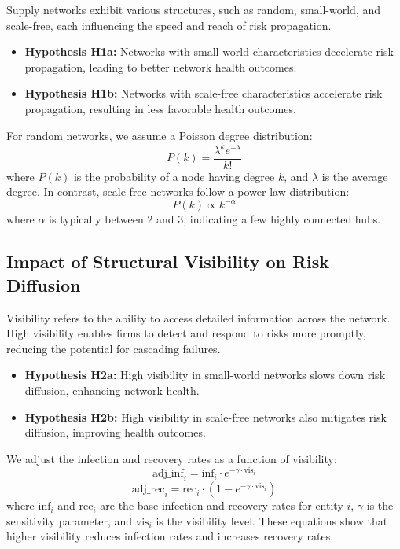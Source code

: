\documentclass{article}
\begin{document}
Supply networks exhibit various structures, such as random, small-world, and scale-free, each influencing the speed and reach of risk propagation.

\begin{itemize}
    \item \textbf{Hypothesis H1a:} Networks with small-world characteristics decelerate risk propagation, leading to better network health outcomes.
    \item \textbf{Hypothesis H1b:} Networks with scale-free characteristics accelerate risk propagation, resulting in less favorable health outcomes.
\end{itemize}

For random networks, we assume a Poisson degree distribution:
\begin{equation}
    P(k) = \frac{\lambda^k e^{-\lambda}}{k!}
\end{equation}
where \( P(k) \) is the probability of a node having degree \( k \), and \( \lambda \) is the average degree. In contrast, scale-free networks follow a power-law distribution:
\begin{equation}
    P(k) \propto k^{-\alpha}
\end{equation}
where \( \alpha \) is typically between 2 and 3, indicating a few highly connected hubs.

\subsection{Impact of Structural Visibility on Risk Diffusion}

Visibility refers to the ability to access detailed information across the network. High visibility enables firms to detect and respond to risks more promptly, reducing the potential for cascading failures.

\begin{itemize}
    \item \textbf{Hypothesis H2a:} High visibility in small-world networks slows down risk diffusion, enhancing network health.
    \item \textbf{Hypothesis H2b:} High visibility in scale-free networks also mitigates risk diffusion, improving health outcomes.
\end{itemize}

We adjust the infection and recovery rates as a function of visibility:
\begin{equation}
    \text{adj\_inf}_i = \text{inf}_i \cdot e^{-\gamma \cdot \text{vis}_i}
\end{equation}
\begin{equation}
    \text{adj\_rec}_i = \text{rec}_i \cdot \left(1 - e^{-\gamma \cdot \text{vis}_i}\right)
\end{equation}
where \( \text{inf}_i \) and \( \text{rec}_i \) are the base infection and recovery rates for entity \( i \), \( \gamma \) is the sensitivity parameter, and \( \text{vis}_i \) is the visibility level. These equations show that higher visibility reduces infection rates and increases recovery rates.
\end{document}
